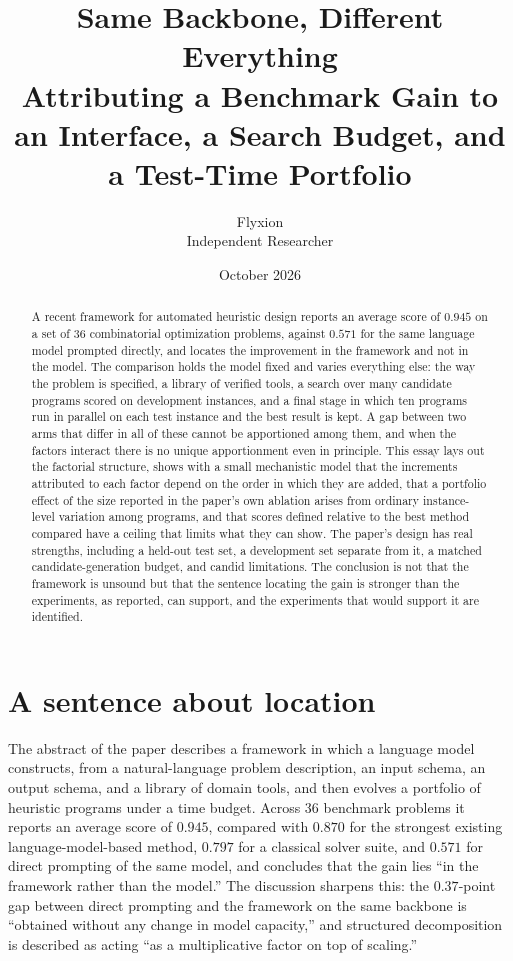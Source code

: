 \documentclass[11pt]{article}
\title{Same Backbone, Different Everything\\[4pt]
\large Attributing a Benchmark Gain to an Interface, a Search Budget, and a Test-Time Portfolio}
\author{Flyxion\\Independent Researcher}
\date{October 2026}
\theoremstyle{definition}
\begin{document}
\maketitle

\begin{abstract}
\noindent
A recent framework for automated heuristic design reports an average score of $0.945$ on a set of 36 combinatorial optimization problems, against $0.571$ for the same language model prompted directly, and locates the improvement in the framework and not in the model. The comparison holds the model fixed and varies everything else: the way the problem is specified, a library of verified tools, a search over many candidate programs scored on development instances, and a final stage in which ten programs run in parallel on each test instance and the best result is kept. A gap between two arms that differ in all of these cannot be apportioned among them, and when the factors interact there is no unique apportionment even in principle. This essay lays out the factorial structure, shows with a small mechanistic model that the increments attributed to each factor depend on the order in which they are added, that a portfolio effect of the size reported in the paper's own ablation arises from ordinary instance-level variation among programs, and that scores defined relative to the best method compared have a ceiling that limits what they can show. The paper's design has real strengths, including a held-out test set, a development set separate from it, a matched candidate-generation budget, and candid limitations. The conclusion is not that the framework is unsound but that the sentence locating the gain is stronger than the experiments, as reported, can support, and the experiments that would support it are identified.
\end{abstract}

\section{A sentence about location}

The abstract of the paper \citep{gong2026} describes a framework in which a language model constructs, from a natural-language problem description, an input schema, an output schema, and a library of domain tools, and then evolves a portfolio of heuristic programs under a time budget. Across 36 benchmark problems it reports an average score of $0.945$, compared with $0.870$ for the strongest existing language-model-based method, $0.797$ for a classical solver suite, and $0.571$ for direct prompting of the same model, and concludes that the gain lies ``in the framework rather than the model.'' The discussion sharpens this: the $0.37$-point gap between direct prompting and the framework on the same backbone is ``obtained without any change in model capacity,'' and structured decomposition is described as acting ``as a multiplicative factor on top of scaling.''
\end{document}
